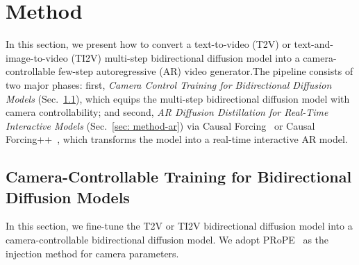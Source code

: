 \section{Method}
\label{sec: method}
In this section, we present how to convert a text-to-video (T2V) or text-and-image-to-video (TI2V) multi-step bidirectional diffusion model into a camera-controllable few-step autoregressive (AR) video generator.The pipeline consists of two major phases: first, \emph{Camera Control Training for Bidirectional Diffusion Models} (Sec.~\ref{sec: method-bidirectional}), which equips the multi-step bidirectional diffusion model with camera controllability; and second, \emph{AR Diffusion Distillation for Real-Time Interactive Models} (Sec.~\ref{sec: method-ar}) via Causal Forcing~\cite{zhu2026causal} or Causal Forcing++~\cite{zhao2026causal}, which transforms the model into a real-time interactive AR model.

\subsection{Camera-Controllable Training for Bidirectional Diffusion Models}
\label{sec: method-bidirectional}

In this section, we fine-tune the T2V or TI2V bidirectional diffusion model into a camera-controllable bidirectional diffusion model. We adopt PRoPE~\cite{li2026cameras} as the injection method for camera parameters.

